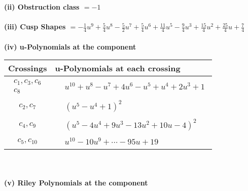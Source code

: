 \documentclass[1p]{elsarticle_modified}
\theoremstyle{definition}
\begin{document}
\flushleft \textbf{(ii) Obstruction class $= -1$}\\~\\
\flushleft \textbf{(iii) Cusp Shapes $= -\frac{1}{4} u^9+\frac{5}{4} u^8-\frac{5}{2} u^7+\frac{5}{4} u^6+\frac{11}{4} u^5-\frac{9}{4} u^3+\frac{15}{4} u^2+\frac{25}{4} u+\frac{7}{4}$}\\~\\
\newpage\renewcommand{\arraystretch}{1}
\flushleft \textbf{(iv) u-Polynomials at the component}\newline \\
\begin{tabular}{m{50pt}|m{274pt}}
Crossings & \hspace{64pt}u-Polynomials at each crossing \\
\hline $$\begin{aligned}c_{1},c_{3},c_{6}\\c_{8}\end{aligned}$$&$\begin{aligned}
&u^{10}+u^8- u^7+4 u^6- u^5+u^4+2 u^3+1
\end{aligned}$\\
\hline $$\begin{aligned}c_{2},c_{7}\end{aligned}$$&$\begin{aligned}
&(u^5- u^4+1)^2
\end{aligned}$\\
\hline $$\begin{aligned}c_{4},c_{9}\end{aligned}$$&$\begin{aligned}
&(u^5-4 u^4+9 u^3-13 u^2+10 u-4)^2
\end{aligned}$\\
\hline $$\begin{aligned}c_{5},c_{10}\end{aligned}$$&$\begin{aligned}
&u^{10}-10 u^9+\cdots-95 u+19
\end{aligned}$\\
\hline
\end{tabular}\\~\\
\newpage\renewcommand{\arraystretch}{1}
\flushleft \textbf{(v) Riley Polynomials at the component}\newline \\
\end{document}
